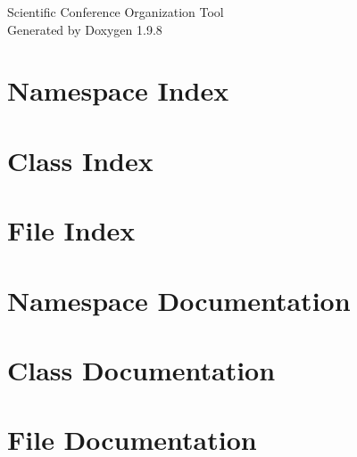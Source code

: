 \documentclass[twoside]{book}
\newcommand{\+}{\discretionary{\mbox{\scriptsize$\hookleftarrow$}}{}{}}
\newcommand{\clearemptydoublepage}{%
    \newpage{\pagestyle{empty}\cleardoublepage}%
  }
\begin{document}
  \raggedbottom
    \hypersetup{pageanchor=false,
                bookmarksnumbered=true,
                pdfencoding=unicode
               }
  \begin{titlepage}
  \vspace*{7cm}
  \begin{center}%
  {\Large Scientific Conference Organization Tool}\\
  \vspace*{1cm}
  {\large Generated by Doxygen 1.9.8}\\
  \end{center}
  \end{titlepage}
  \clearemptydoublepage
  \tableofcontents
  \clearemptydoublepage
  \hypersetup{pageanchor=true}

\chapter{Namespace Index}

\chapter{Class Index}

\chapter{File Index}

\chapter{Namespace Documentation}

\chapter{Class Documentation}






\chapter{File Documentation}






















  \backmatter
  \newpage
  \clearemptydoublepage
  \printindex
\end{document}
